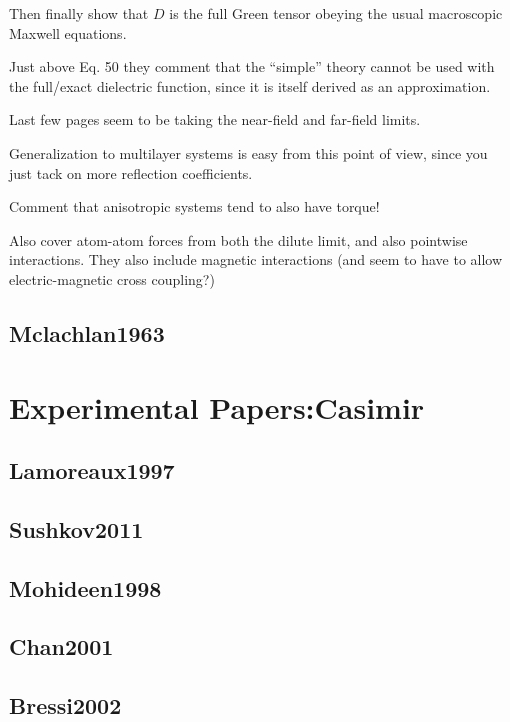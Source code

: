 Then finally show that $D$ is the full Green tensor obeying the usual macroscopic Maxwell equations.  

Just above Eq. 50 they comment that the ``simple'' theory cannot be used with the
 full/exact dielectric function, since it is itself derived as an approximation.  

Last few pages seem to be taking the near-field and far-field limits.  

Generalization to multilayer systems is easy from this point of view,
 since you just tack on more reflection coefficients.  

Comment that anisotropic systems tend to also have torque!

Also cover atom-atom forces from both the dilute limit, and also pointwise interactions.  
They also include magnetic interactions (and seem to have to allow electric-magnetic cross coupling?)

\subsection{Mclachlan1963}

\cite{McLachlan1963}

\section{Experimental Papers:Casimir}

\subsection{Lamoreaux1997}

\cite{Lamoreaux1997}
\subsection{Sushkov2011}

\cite{Sushkov2011}
\subsection{Mohideen1998}
\cite{Mohideen1998} 

\subsection{Chan2001}

\cite{Chan2001}
\subsection{Bressi2002}

